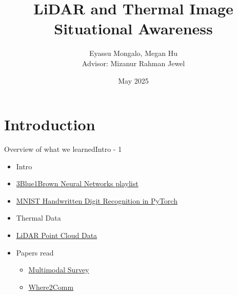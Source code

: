 \documentclass{beamer}
\title{LiDAR and Thermal Image Situational Awareness}
\author{\texorpdfstring{Eyassu Mongalo, Megan Hu \\ \small Advisor: Mizanur Rahman Jewel}
    {Eyassu Mongalo, Megan Hu, Advisor: Mizanur Rahman Jewel}}
\date{May 2025}
\begin{document}
\maketitle
\section{Introduction}

\begin{frame}{Overview of what we learned}{Intro - 1}
\begin{itemize}
    \item Intro
    \item \href{https://www.youtube.com/playlist?list=PLZHQObOWTQDNU6R1_67000Dx_ZCJB-3pi}{3Blue1Brown Neural Networks playlist}
    \item \href{https://nextjournal.com/gkoehler/pytorch-mnist}{MNIST Handwritten Digit Recognition in PyTorch}
    \item Thermal Data
    \item \href{https://www.faro.com/en/Resource-Library/Article/Point-Clouds-for-Beginners}{LiDAR Point Cloud Data}
    \item Papers read
    \begin{itemize}
        \item \href{https://ieeexplore.ieee.org/stamp/stamp.jsp?arnumber=10123038}{Multimodal Survey}
        \item \href{https://proceedings.neurips.cc/paper_files/paper/2022/file/1f5c5cd01b864d53cc5fa0a3472e152e-Paper-Conference.pdf}{Where2Comm}
    \end{itemize}
\end{itemize}
\end{frame}
\end{document}
